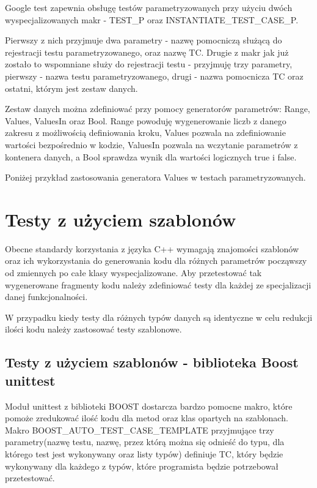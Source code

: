 \documentclass[12pt,a4paper,notitlepage]{report}
\begin{document}
Google test zapewnia obsługę testów parametryzowanych przy użyciu dwóch wyspecjalizowanych makr - TEST{\_}P oraz INSTANTIATE{\_}TEST{\_}CASE{\_}P.

Pierwszy z nich przyjmuje dwa parametry - nazwę pomocniczą służącą do rejestracji testu parametryzowanego, oraz nazwę TC. Drugie z makr jak już zostało to wspomniane służy do rejestracji testu  - przyjmuję trzy parametry, pierwszy - nazwa testu parametryzowanego, drugi - nazwa pomocnicza TC oraz ostatni, którym jest zestaw danych.

Zestaw danych można zdefiniować przy pomocy generatorów parametrów: Range, Values, ValuesIn oraz Bool. Range powoduję wygenerowanie liczb z danego zakresu z możliwością definiowania kroku, Values pozwala na zdefiniowanie wartości bezpośrednio w kodzie, ValuesIn pozwala na wczytanie parametrów z kontenera danych, a Bool sprawdza wynik dla wartości logicznych true i false.

Poniżej przykład zastosowania generatora Values w testach parametryzowanych.

			

\chapter{Testy z użyciem szablonów}

Obecne standardy korzystania z języka C++ wymagają znajomości szablonów oraz ich wykorzystania do generowania kodu dla różnych parametrów począwszy od zmiennych po całe klasy wyspecjalizowane. Aby przetestować tak wygenerowane fragmenty kodu należy zdefiniować testy dla każdej ze specjalizacji danej funkcjonalności.

W przypadku kiedy testy dla różnych typów danych są identyczne w celu redukcji ilości kodu należy zastosować testy szablonowe.

\section{Testy z użyciem szablonów - biblioteka Boost unittest}

Moduł unittest z biblioteki BOOST dostarcza bardzo pomocne makro, które pomoże zredukować ilość kodu dla metod oraz klas opartych na szablonach. Makro BOOST{\_}AUTO{\_}TEST{\_}CASE{\_}TEMPLATE przyjmujące trzy parametry(nazwę testu, nazwę, przez którą można się odnieść do typu, dla którego test jest wykonywany oraz listy typów) definiuje TC, który będzie wykonywany dla każdego z typów, które programista będzie potrzebował przetestować.
\end{document}
